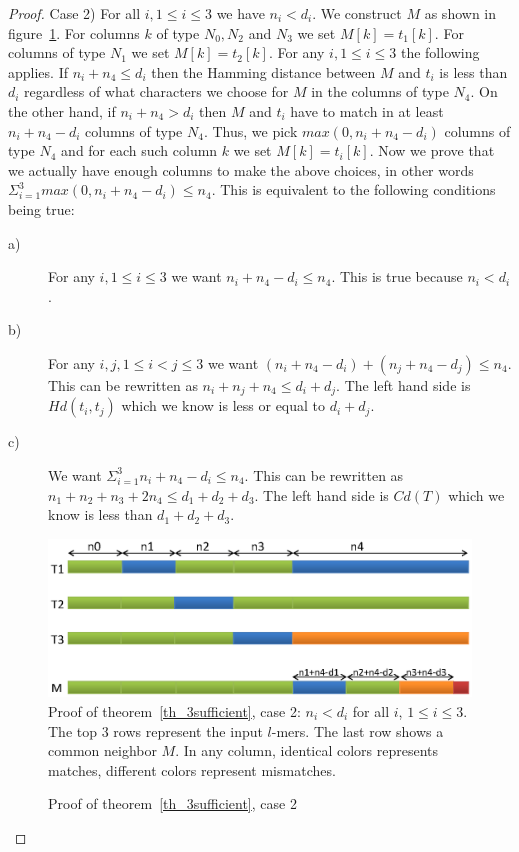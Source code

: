\begin{proof}
Case 2) For all $i, 1 \leq i \leq 3$ we have $n_i < d_i$. We construct $M$ as
shown in figure~\ref{figProofCase2}. For columns $k$ of type $N_0,N_2$ and $N_3$
we set $M[k]=t_1[k]$. For columns of type $N_1$ we set $M[k]=t_2[k]$.
For any $i,1\leq i \leq 3$ the following applies. If $n_i+n_4\leq d_i$ then the
Hamming distance between $M$ and $t_i$ is less than $d_i$ regardless of what
characters we choose for $M$ in the columns of type $N_4$.
On the other hand, if $n_i+n_4 > d_i$ then $M$ and $t_i$ have to match in at
least $n_i+n_4-d_i$ columns of type $N_4$. Thus, we pick
$max(0,n_i+n_4-d_i)$ columns of type $N_4$ and for each such column $k$ we set
$M[k]=t_i[k]$.
Now we prove that we actually have enough columns to make the
above choices, in other words $\Sigma_{i=1}^3max(0,n_i+n_4-d_i)\leq n_4$. This is equivalent to the following
conditions being true:
\begin{description}
\item[a)] For any $i, 1\leq i \leq 3$ we want $n_i+n_4-d_i \leq n_4$. This is
true because $n_i < d_i$.
\item[b)] For any $i,j, 1\leq i < j \leq 3$ we want
$(n_i+n_4-d_i)+(n_j+n_4-d_j) \leq n_4$. This can be rewritten as
$n_i+n_j+n_4\leq d_i+d_j$. The left hand side is $Hd(t_i, t_j)$ which
we know is less or equal to $d_i+d_j$.
\item[c)] We want $\Sigma_{i=1}^3n_i+n_4-d_i \leq n_4$. This can be rewritten as
$n_1 + n_2 + n_3 + 2 n_4 \leq d_1+d_2+d_3$. The left hand side is $Cd(T)$ which
we know is less than $d_1+d_2+d_3$.
\end{description}


\begin{figure}[!h]
\caption{Proof of theorem~\ref{th_3sufficient},
case 2}\label{figProofCase2}
\includegraphics[width=\linewidth]{proof-case2}
Proof of theorem~\ref{th_3sufficient},
case 2: $n_i<d_i$ for all $i$, $1\leq i \leq 3$.
The top 3 rows represent the input $l$-mers. The last row shows a common neighbor $M$. In any
column, identical colors represents matches, different colors represent mismatches.
\end{figure}
\end{proof}



